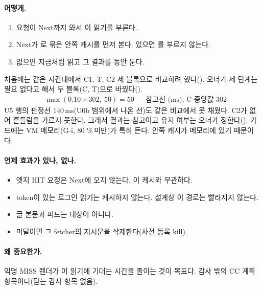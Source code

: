 \paragraph{어떻게.}
\begin{enumerate}[nosep]
  \item 요청이 Next까지 와서 이 읽기를 부른다.
  \item Next가 로 묶은 안쪽 캐시를 먼저 본다. 있으면 를 부르지 않는다.
  \item 없으면 지금처럼 읽고 그 결과를  동안 둔다.
\end{enumerate}
처음에는 같은 시간대에서 C1, T, C2 세 블록으로 비교하려 했다().
오너가 세 단계는 필요 없다고 해서 두 블록(C, T)으로 바꿨다().
\begin{align*}
  &\max(0.10\times 302,\ 50) = 50 && \text{참고선 (ms), C 중앙값 302}
\end{align*}
 U5 행의 판정선 140\,ms(U0b 범위에서 나온 선)도 같은 비교에서 못 채웠다.
C2가 없어 흔들림을 가르지 못한다. 그래서 결과는 참고이고 유지 여부는 오너가 정한다().
가드에는 VM 메모리(G-i, 80 \%\,미만)가 특히 든다. 안쪽 캐시가 메모리에 있기 때문이다.

\paragraph{언제 효과가 있나, 없나.}
\begin{itemize}[nosep]
  \item 엣지 HIT 요청은 Next에 오지 않는다. 이 캐시와 무관하다.
  \item token이 있는 로그인 읽기는 캐시하지 않는다. 설계상 이 경로는 빨라지지 않는다.
  \item 글 본문과 피드는 대상이 아니다.
  \item 미달이면 그 fetcher의 지시문을 삭제한다(사전 등록 kill).
\end{itemize}

\paragraph{왜 중요한가.}
익명 MISS 렌더가 이 읽기에 기대는 시간을 줄이는 것이 목표다. 감사 밖의 CC 계획 항목이다(닫는 감사 항목 없음).

